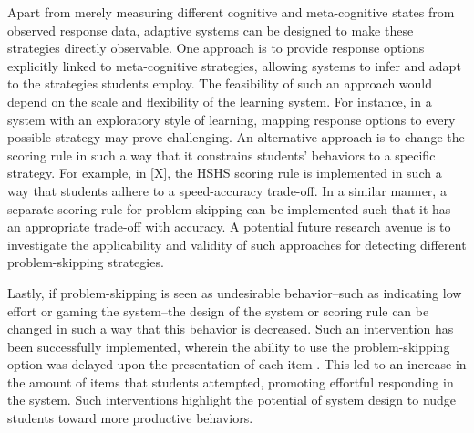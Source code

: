 \documentclass{edm_article}
\begin{document}
Apart from merely measuring different cognitive and meta-cognitive states from observed response data, adaptive systems can be designed to make these strategies directly observable. One approach is to provide response options explicitly linked to meta-cognitive strategies, allowing systems to infer and adapt to the strategies students employ. The feasibility of such an approach would depend on the scale and flexibility of the learning system. For instance, in a system with an exploratory style of learning, mapping response options to every possible strategy may prove challenging. An alternative approach is to change the scoring rule in such a way that it constrains students' behaviors to a specific strategy. For example, in [X], the HSHS scoring rule \cite{maris2012speed} is implemented in such a way that students adhere to a speed-accuracy trade-off. In a similar manner, a separate scoring rule for problem-skipping can be implemented such that it has an appropriate trade-off with accuracy. A potential future research avenue is to investigate the applicability and validity of such approaches for detecting different problem-skipping strategies. 

Lastly, if problem-skipping is seen as undesirable behavior--such as indicating low effort or gaming the system--the design of the system or scoring rule can be changed in such a way that this behavior is decreased. Such an intervention has been successfully implemented, wherein the ability to use the problem-skipping option was delayed upon the presentation of each item \cite{savi2018delaying}. This led to an increase in the amount of items that students attempted, promoting effortful responding in the system. Such interventions highlight the potential of system design to nudge students toward more productive behaviors.
\end{document}
